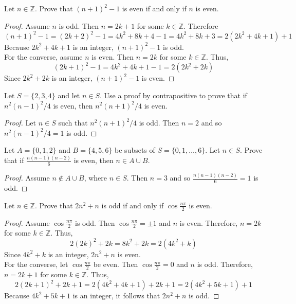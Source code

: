\documentclass[12pt]{article}
\newcommand{\Z}{\mathbb{Z}}
\newenvironment{problem}[2][Problem]{\begin{trivlist}
		\item[\hskip \labelsep {\bfseries #1}\hskip \labelsep {\bfseries #2.}]}{\end{trivlist}}
\begin{document}
	\begin{problem}{21}
		Let $n\in \Z$. Prove that $(n+1)^{2}-1$ is even if and only if $n$ is even.
		\begin{proof}
			Assume $n$ is odd. Then $n=2k+1$ for some $k\in \Z$. Therefore
			\begin{equation*}
				(n+1)^{2}-1=(2k+2)^{2}-1=4k^{2}+8k+4-1=4k^{2}+8k+3=2(2k^{2}+4k+1)+1
			\end{equation*}
			Because $2k^{2}+4k+1$ is an integer, $(n+1)^{2}-1$ is odd.\\
			For the converse, assume $n$ is even. Then $n=2k$ for some $k\in \Z$. Thus,
			\begin{equation*}
				(2k+1)^{2}-1=4k^{2}+4k+1-1=2(2k^{2}+2k)
			\end{equation*}
		Since $2k^{2}+2k$ is an integer, $(n+1)^{2}-1$ is even.
		\end{proof}
	\end{problem}

	\begin{problem}{22}
		Let $S=\{2,3,4\}$ and let $n\in S$. Use a proof by contrapositive to prove that if $n^{2}(n-1)^{2}/4$ is even, then $n^{2}(n+1)^{2}/4$ is even.
		\begin{proof}
			Let $n\in S$ such that $n^{2}(n+1)^{2}/4$ is odd. Then $n=2$ and so $n^{2}(n-1)^{2}/4=1$ is odd.
		\end{proof}
	\end{problem}

	\begin{problem}{23}
		Let $A=\{0,1,2\}$ and $B=\{4,5,6\}$ be subsets of $S=\{0,1,\ldots,6\}$. Let $n\in S$. Prove that if $\frac{n(n-1)(n-2)}{6}$ is even, then $n \in A\cup B$.
		\begin{proof}
			Assume $n \notin A\cup B$, where $n\in S$. Then $n=3$ and so $\frac{n(n-1)(n-2)}{6}=1$ is odd.
		\end{proof}
	\end{problem}

	\begin{problem}{24}
		Let $n\in \Z$. Prove that $2n^{2}+n$ is odd if and only if $\cos \frac{n\pi}{2}$ is even.
		\begin{proof}
			Assume $\cos \frac{n\pi}{2}$ is odd. Then $\cos \frac{n\pi}{2}=\pm 1$ and $n$ is even. Therefore, $n=2k$ for some $k\in \Z$. Thus,
			\begin{equation*}
				2(2k)^{2}+2k=8k^{2}+2k=2(4k^{2}+k)
			\end{equation*}
		Since $4k^{2}+k$ is an integer, $2n^{2}+n$ is even.\\
		For the converse, let $\cos \frac{n\pi}{2}$ be even. Then $\cos \frac{n\pi}{2}=0$ and $n$ is odd. Therefore, $n=2k+1$ for some $k\in \Z$. Thus,
		\begin{equation*}
			2(2k+1)^{2}+2k+1=2(4k^{2}+4k+1)+2k+1=2(4k^{2}+5k+1)+1
		\end{equation*}
	Because $4k^{2}+5k+1$ is an integer, it follows that $2n^{2}+n$ is odd.
		\end{proof}
	\end{problem}
\end{document}
